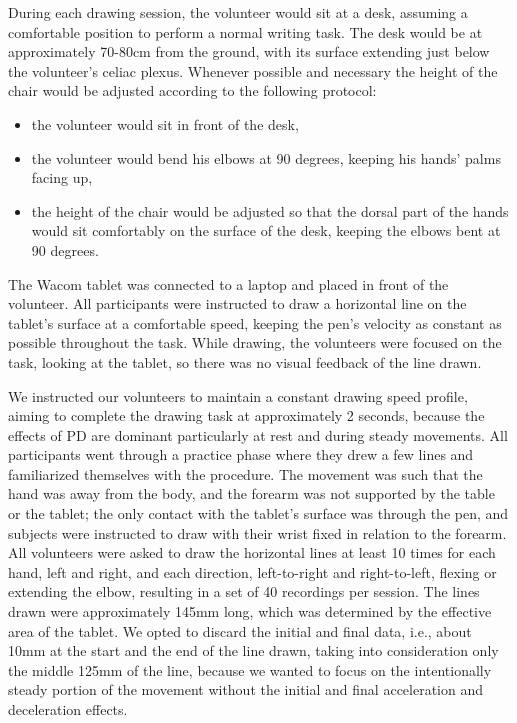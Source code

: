 During each drawing session, the volunteer would sit at a desk, assuming a comfortable position to perform a normal writing task. The desk would be at approximately 70-80cm from the ground, with its surface extending just below the volunteer's celiac plexus. Whenever possible and necessary the height of the chair would be adjusted according to the following protocol:
\begin{itemize}
\item the volunteer would sit in front of the desk,
\item the volunteer would bend his elbows at 90 degrees, keeping his hands' palms facing up,
\item the height of the chair would be adjusted so that the dorsal part of the hands would sit comfortably on the surface of the desk, keeping the elbows bent at 90 degrees. 
\end{itemize}
\noindent
The Wacom tablet was connected to a laptop and placed in front of the volunteer. All participants were instructed to draw a horizontal line on the tablet's surface at a comfortable speed, keeping the pen's velocity as constant as possible throughout the task. While drawing, the volunteers were focused on the task, looking at the tablet, so there was no visual feedback of the line drawn. 

We instructed our volunteers to maintain a constant drawing speed profile, aiming to complete the drawing task at approximately 2 seconds, because the effects of \gls{PD} are dominant particularly at rest and during steady movements. All participants went through a practice phase where they drew a few lines and familiarized themselves with the procedure. The movement was such that the hand was away from the body, and the forearm was not supported by the table or the tablet; the only contact with the tablet's surface was through the pen, and subjects were instructed to draw with their wrist fixed in relation to the forearm. All volunteers were asked to draw the horizontal lines at least 10 times for each hand, left and right, and each direction, left-to-right and right-to-left, flexing or extending the elbow, resulting in a set of 40 recordings per session. The lines drawn were approximately 145mm long, which was determined by the effective area of the tablet. We opted to discard the initial and final data, i.e., about 10mm at the start and the end of the line drawn, taking into consideration only the middle 125mm of the line, because we wanted to focus on the intentionally steady portion of the movement without the initial and final acceleration and deceleration effects. 


